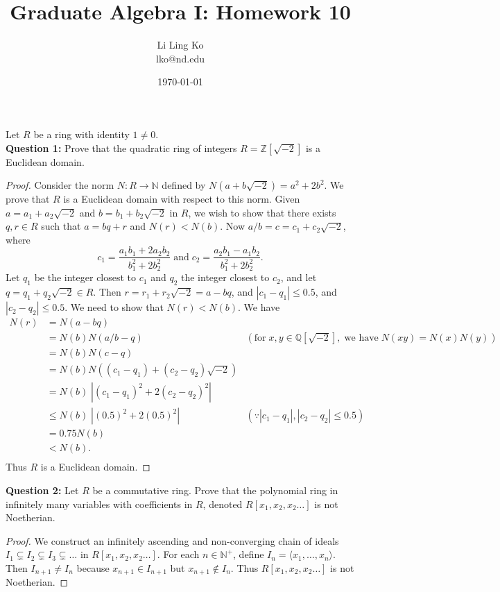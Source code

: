 \documentclass{article}
\begin{document}
\title{Graduate Algebra I: Homework 10}
\author{Li Ling Ko\\ lko@nd.edu}
\date{\today}
\maketitle

Let $R$ be a ring with identity $1\neq0$. \\

\textbf{Question 1:} Prove that the quadratic ring of integers
  $R=\mathbb{Z}[\sqrt{-2}]$ is a Euclidean domain.
  \begin{proof}
    Consider the norm $N:R\rightarrow\mathbb{N}$ defined by
    $N(a+b\sqrt{-2})=a^2+2b^2$. We prove that $R$ is a Euclidean domain
    with respect to this norm. Given
    $a=a_1+a_2\sqrt{-2}$ and $b=b_1+b_2\sqrt{-2}$ in $R$,
    we wish to show that there exists $q,r\in R$ such
    that $a=bq+r$ and $N(r)<N(b)$. Now $a/b=c=c_1+c_2\sqrt{-2}$, where
    \[c_1=\frac{a_1b_1+2a_2b_2}{b_1^2+2b_2^2}\; \text{and}\;
      c_2=\frac{a_2b_1-a_1b_2}{b_1^2+2b_2^2}.\]
    Let $q_1$ be the integer
    closest to $c_1$ and $q_2$ the integer closest to $c_2$, and let
    $q=q_1+q_2\sqrt{-2}\in R$. Then
    $r=r_1+r_2\sqrt{-2}=a-bq$, and $|c_1-q_1|\leq0.5$, and
    $|c_2-q_2|\leq0.5$. We need to show that $N(r)<N(b)$. We have
    \begin{align*}
      N(r) &= N(a-bq) \\
        &=N(b)N(a/b-q) &(\text{for}\; x,y\in\mathbb{Q}[\sqrt{-2}],\;
          \text{we have}\; N(xy)=N(x)N(y)) \\
        &=N(b)N(c-q) \\
        &=N(b)N\left((c_1-q_1)+(c_2-q_2)\sqrt{-2}\right) \\
        &=N(b)\; \left|(c_1-q_1)^2+2(c_2-q_2)^2\right| \\
        &\leq N(b)\; \left|(0.5)^2+2(0.5)^2\right| &(\because
          |c_1-q_1|,|c_2-q_2|\leq0.5) \\
        &=0.75N(b) \\
        &<N(b). \\
    \end{align*}
    Thus $R$ is a Euclidean domain.
  \end{proof}

\textbf{Question 2:} Let $R$ be a commutative ring. Prove that the
  polynomial ring in infinitely many variables with coefficients in $R$,
  denoted $R[x_1,x_2,x_2\ldots]$ is not Noetherian.

  \begin{proof}
    We construct an infinitely ascending and non-converging chain of ideals
    $I_1\subsetneq I_2\subsetneq I_3\subsetneq\ldots$ in
    $R[x_1,x_2,x_2\ldots]$. For each $n\in\mathbb{N}^+$, define
    $I_n=\langle x_1,\ldots,x_n\rangle$. Then $I_{n+1}\neq I_n$ because
    $x_{n+1}\in I_{n+1}$ but $x_{n+1}\not\in I_{n}$. Thus
    $R[x_1,x_2,x_2\ldots]$ is not Noetherian.
  \end{proof}
\end{document}
